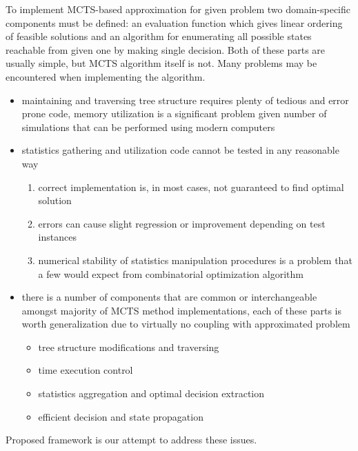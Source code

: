 To implement MCTS-based approximation for given problem two domain-specific
components must be defined: an evaluation function which gives linear ordering
of feasible solutions and an algorithm for enumerating all possible states
reachable from given one by making single decision.
Both of these parts are usually simple, but MCTS algorithm itself is not. Many
problems may be encountered when implementing the algorithm.
\begin{itemize}
  \item maintaining and traversing tree structure requires plenty of tedious
  and error prone code, memory utilization is a significant problem given
  number of simulations that can be performed using modern computers
  \item statistics gathering and utilization code cannot be tested in any reasonable way
    \begin{enumerate}
      \item correct implementation is, in most cases, not guaranteed to find optimal solution
      \item errors can cause slight regression or improvement depending on test instances
      \item numerical stability of statistics manipulation procedures is a
      problem that a few would expect from combinatorial optimization algorithm
    \end{enumerate}
  \item there is a number of components that are common or interchangeable
  amongst majority of MCTS method implementations, each of these parts is worth
  generalization due to virtually no coupling with approximated problem
    \begin{itemize}
      \item tree structure modifications and traversing
      \item time execution control
      \item statistics aggregation and optimal decision extraction
      \item efficient decision and state propagation
    \end{itemize}
\end{itemize}

Proposed framework is our attempt to address these issues.

